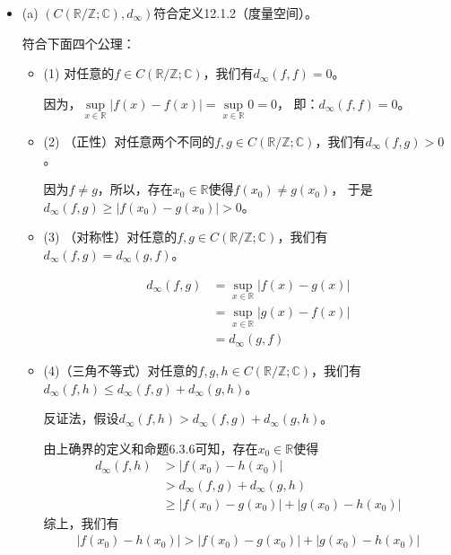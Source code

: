 \documentclass{article}
\begin{document}
\begin{itemize}
  \item (a) $(C(\mathbb{R}/\mathbb{Z}; \mathbb{C}),d_{\infty})$符合定义12.1.2（度量空间）。

        符合下面四个公理：
        \begin{itemize}
          \item (1) 对任意的$f \in C(\mathbb{R}/\mathbb{Z}; \mathbb{C})$，我们有$d_{\infty}(f, f) = 0$。

                因为，$\sup\limits_{x \in \mathbb{R}} |f(x) - f(x)| = \sup\limits_{x \in \mathbb{R}} 0 = 0$，
                即：$d_{\infty}(f, f) = 0$。
          \item (2) （正性）对任意两个不同的$f, g \in C(\mathbb{R}/\mathbb{Z}; \mathbb{C})$，我们有$d_{\infty}(f, g) > 0$。

                因为$f \neq g$，所以，存在$x_0 \in \mathbb{R}$使得$f(x_0) \neq g(x_0)$，
                于是$d_{\infty}(f, g) \geq |f(x_0) - g(x_0)| > 0$。

          \item (3) （对称性）对任意的$f, g \in C(\mathbb{R}/\mathbb{Z}; \mathbb{C})$，我们有$d_{\infty}(f, g) = d_{\infty}(g, f)$。

                \begin{align*}
                  d_{\infty}(f, g) & = \sup\limits_{x \in \mathbb{R}} |f(x) - g(x)| \\
                                   & = \sup\limits_{x \in \mathbb{R}} |g(x) - f(x)| \\
                                   & = d_{\infty}(g, f)
                \end{align*}

          \item (4)（三角不等式）对任意的$f,g,h \in C(\mathbb{R}/\mathbb{Z}; \mathbb{C})$，我们有$d_{\infty}(f, h) \leq d_{\infty}(f, g) + d_{\infty}(g, h)$。

                反证法，假设$d_{\infty}(f, h) > d_{\infty}(f, g) + d_{\infty}(g, h)$。

                由上确界的定义和命题6.3.6可知，存在$x_0 \in \mathbb{R}$使得
                \begin{align*}
                  d_{\infty}(f, h) & > |f(x_0) - h(x_0)|                        \\
                                   & > d_{\infty}(f, g) + d_{\infty}(g, h)      \\
                                   & \geq |f(x_0) - g(x_0)| + |g(x_0) - h(x_0)|
                \end{align*}
                综上，我们有
                \begin{align*}
                  |f(x_0) - h(x_0)| > |f(x_0) - g(x_0)| + |g(x_0) - h(x_0)|
                \end{align*}


\end{itemize}
\end{itemize}
\end{document}
